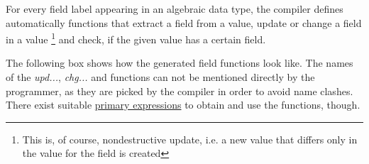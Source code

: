 For every field label appearing in an algebraic data type, 
the compiler defines automatically functions that extract a field from a value,
update or change a field in a value
\footnote{This is, of course, nondestructive update, i.e. a new value that differs only in the value for the field is created} 
and check, if the given value has a certain field.

The following box shows how the generated field functions look like. The names of the \emph{upd...}, 
\emph{chg...} and  functions can not be mentioned directly by the programmer, 
as they are picked by the compiler in order to avoid name clashes. 
There exist suitable  \hyperref[primexp]{primary expressions} to obtain and use the functions, though.

